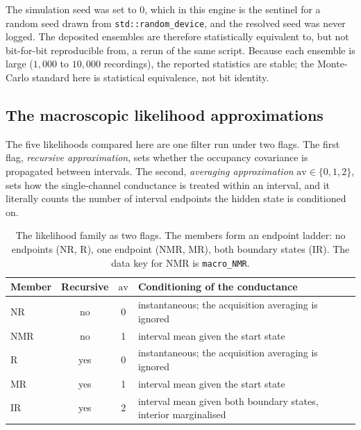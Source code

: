 The simulation seed was set to $0$, which in this engine is the sentinel for a
random seed drawn from \texttt{std::random\_device}, and the resolved seed was
never logged. The deposited ensembles are therefore statistically equivalent to,
but not bit-for-bit reproducible from, a rerun of the same script. Because each
ensemble is large ($1{,}000$ to $10{,}000$ recordings), the reported statistics are
stable; the Monte-Carlo standard here is statistical equivalence, not bit identity.

\subsection*{The macroscopic likelihood approximations}

The five likelihoods compared here are one filter run under two flags. The first flag, \emph{recursive approximation}, sets whether the
occupancy covariance is propagated between intervals. The second,
\emph{averaging approximation} $\mathrm{av}\in\{0,1,2\}$, sets how the
single-channel conductance is treated within an interval, and it literally counts
the number of interval endpoints the hidden state is conditioned on.

\begin{table}[htbp]
\centering
\begin{tabular}{lccl}
\toprule
Member & Recursive & $\mathrm{av}$ & Conditioning of the conductance \\
\midrule
NR  & no  & 0 & instantaneous; the acquisition averaging is ignored \\
NMR & no  & 1 & interval mean given the start state \\
R   & yes & 0 & instantaneous; the acquisition averaging is ignored \\
MR  & yes & 1 & interval mean given the start state \\
IR  & yes & 2 & interval mean given both boundary states, interior marginalised \\
\bottomrule
\end{tabular}
\caption{The likelihood family as two flags. The members form an endpoint ladder:
no endpoints (NR, R), one endpoint (NMR, MR), both boundary states (IR). The data
key for NMR is \texttt{macro\_NMR}.}
\label{tab:family}
\end{table}

